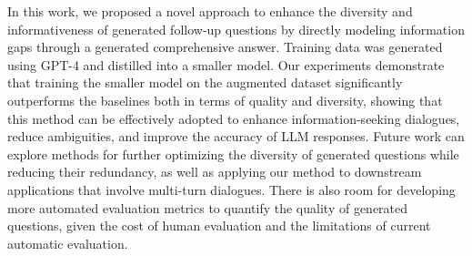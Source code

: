 In this work, we proposed a novel approach to enhance the diversity and informativeness of generated follow-up questions by directly modeling information gaps through a generated comprehensive answer. Training data was generated using GPT-4 and distilled into a smaller model. Our experiments demonstrate that training the smaller model on the augmented dataset significantly outperforms the baselines both in terms of quality and diversity, showing that this method can be effectively adopted to enhance information-seeking dialogues, reduce ambiguities, and improve the accuracy of LLM responses.   %
Future work can explore methods for further optimizing the diversity of generated questions while reducing their redundancy, as well as applying our method to downstream applications that involve multi-turn dialogues. There is also room for developing more automated evaluation metrics to quantify the quality of generated questions, given the cost of human evaluation and the limitations of current automatic evaluation. 


